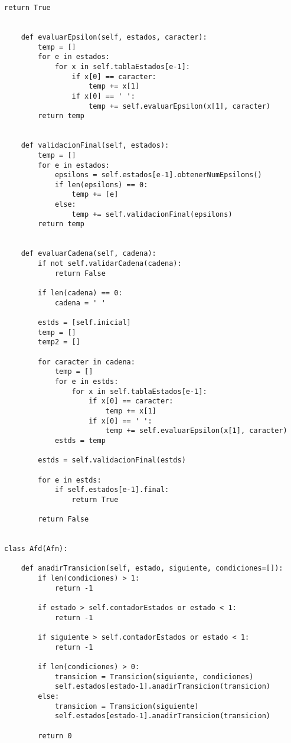 \begin{lstlisting}[frame=single]
        return True


    def evaluarEpsilon(self, estados, caracter):
        temp = []
        for e in estados:
            for x in self.tablaEstados[e-1]:
                if x[0] == caracter:
                    temp += x[1]
                if x[0] == ' ':
                    temp += self.evaluarEpsilon(x[1], caracter)
        return temp


    def validacionFinal(self, estados):
        temp = []
        for e in estados:
            epsilons = self.estados[e-1].obtenerNumEpsilons()
            if len(epsilons) == 0:
                temp += [e]
            else:
                temp += self.validacionFinal(epsilons)
        return temp


    def evaluarCadena(self, cadena):
        if not self.validarCadena(cadena):
            return False

        if len(cadena) == 0:
            cadena = ' '

        estds = [self.inicial]
        temp = []
        temp2 = []

        for caracter in cadena:
            temp = []
            for e in estds:
                for x in self.tablaEstados[e-1]:
                    if x[0] == caracter:
                        temp += x[1]
                    if x[0] == ' ':
                        temp += self.evaluarEpsilon(x[1], caracter)
            estds = temp

        estds = self.validacionFinal(estds)

        for e in estds:
            if self.estados[e-1].final:
                return True

        return False


class Afd(Afn):

    def anadirTransicion(self, estado, siguiente, condiciones=[]):
        if len(condiciones) > 1:
            return -1

        if estado > self.contadorEstados or estado < 1:
            return -1

        if siguiente > self.contadorEstados or estado < 1:
            return -1

        if len(condiciones) > 0:
            transicion = Transicion(siguiente, condiciones)
            self.estados[estado-1].anadirTransicion(transicion)
        else:
            transicion = Transicion(siguiente)
            self.estados[estado-1].anadirTransicion(transicion)

        return 0
\end{lstlisting}

